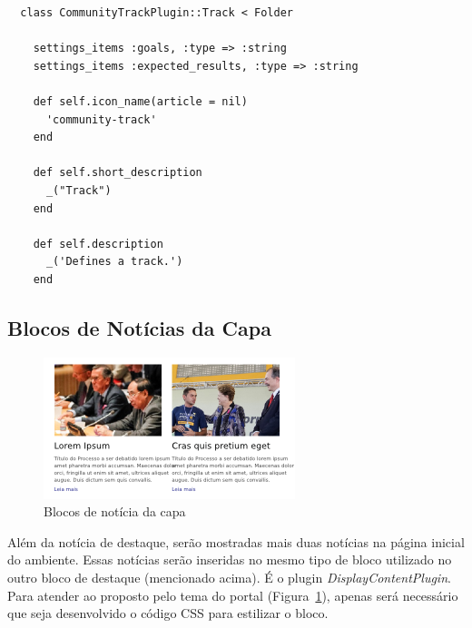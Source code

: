 \documentclass[[a4paper,11pt]{article}
\begin{document}
{\scriptsize
  \begin{verbatim}
  class CommunityTrackPlugin::Track < Folder                   
                                                               
    settings_items :goals, :type => :string                    
    settings_items :expected_results, :type => :string         
                                                               
    def self.icon_name(article = nil)                          
      'community-track'                                        
    end                                                        
                                                               
    def self.short_description                                 
      _("Track")                                               
    end                                                        
                                                               
    def self.description                                       
      _('Defines a track.')                                    
    end
  \end{verbatim}
}

\subsection{Blocos de Notícias da Capa}

\begin{figure}[h]
\center
\includegraphics[scale=0.4]{bloco-destaques-menor.png}
\caption{Blocos de notícia da capa}
\label{fig:bloco-destaques-menor}
\end{figure}

Além da notícia de destaque, serão mostradas mais duas notícias na
página inicial do ambiente. Essas notícias serão inseridas no mesmo tipo
de bloco utilizado no outro bloco de destaque (mencionado acima). É o 
plugin {\it DisplayContentPlugin}. Para atender ao proposto pelo tema do portal
(Figura~\ref{fig:bloco-destaques-menor}), apenas será necessário que
seja desenvolvido o código CSS para estilizar o bloco.
\end{document}
